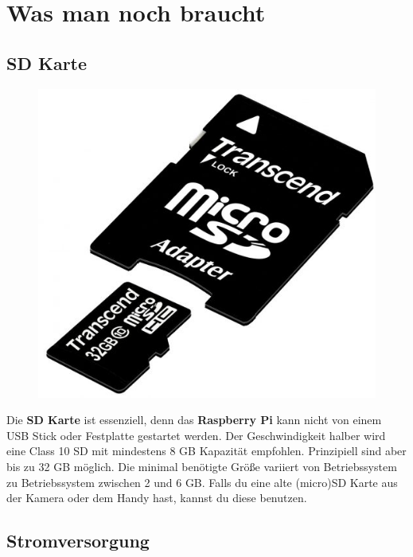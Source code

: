 \documentclass[12pt,a4paper]{article}
\newcommand{\rp}{\textbf{Raspberry Pi}\xspace}
\begin{document}
\section{Was man noch braucht}
\label{sec:acc}

\subsection{SD Karte}

\begin{figure}
  \vspace{-25pt}
  \begin{center}
    \includegraphics[scale=0.2]{sd_card}
  \end{center}
  \vspace{-25pt}
\end{figure}

Die \textbf{SD Karte} ist essenziell, denn das \rp kann nicht von einem USB Stick oder Festplatte gestartet werden. Der Geschwindigkeit halber wird eine Class 10 SD mit mindestens 8 GB Kapazität empfohlen. Prinzipiell sind aber bis zu 32 GB möglich. Die minimal benötigte Größe variiert von Betriebssystem zu Betriebssystem zwischen 2 und 6 GB. Falls du eine alte (micro)SD Karte aus der Kamera oder dem Handy hast, kannst du diese benutzen.

\subsection{Stromversorgung}
\end{document}
